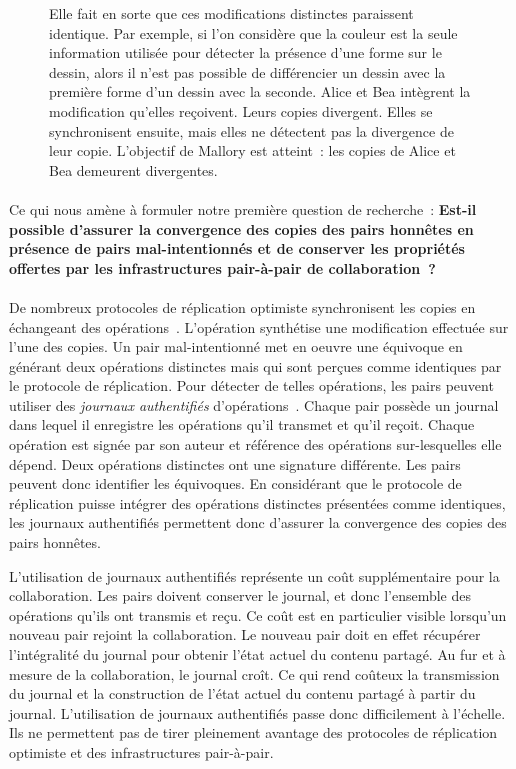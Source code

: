 \begin{figure}[hbt]
{Elle fait en sorte que ces modifications distinctes paraissent identique.
Par exemple, si l'on considère que la couleur est la seule information utilisée pour détecter la présence d'une forme sur le dessin, alors il n'est pas possible de différencier un dessin avec la première forme d'un dessin avec la seconde.
 Alice et Bea intègrent la modification qu'elles reçoivent.
Leurs copies divergent.
Elles se synchronisent ensuite, mais elles ne détectent pas la divergence de leur copie.
L'objectif de Mallory est atteint~: les copies de Alice et Bea demeurent divergentes.}\label{fig:equivocation-scenario}
\end{figure}

\paragraph{}Ce qui nous amène à formuler notre première question de recherche~: \textbf{Est-il possible d'assurer la convergence des copies des pairs honnêtes en présence de pairs mal-intentionnés et de conserver les propriétés offertes par les infrastructures pair-à-pair de collaboration~?}

\paragraph{}De nombreux protocoles de réplication optimiste synchronisent les copies en échangeant des opérations~\autocite{baquero_2018_pure-op-crdt}.
L'opération synthétise une modification effectuée sur l'une des copies.
Un pair mal-intentionné met en oeuvre une équivoque en générant deux opérations distinctes mais qui sont perçues comme identiques par le protocole de réplication.
Pour détecter de telles opérations, les pairs peuvent utiliser des \emph{journaux authentifiés} d'opérations~\autocite{li_2004_sundr,mahajan_depot_2011,truong_authenticating_2012}.
Chaque pair possède un journal dans lequel il enregistre les opérations qu'il transmet et qu'il reçoit.
Chaque opération est signée par son auteur et référence des opérations sur-lesquelles elle dépend.
Deux opérations distinctes ont une signature différente.
Les pairs peuvent donc identifier les équivoques.
En considérant que le protocole de réplication puisse intégrer des opérations distinctes présentées comme identiques, les journaux authentifiés permettent donc d'assurer la convergence des copies des pairs honnêtes.

L'utilisation de journaux authentifiés représente un coût supplémentaire pour la collaboration.
Les pairs doivent conserver le journal, et donc l'ensemble des opérations qu'ils ont transmis et reçu.
Ce coût est en particulier visible lorsqu'un nouveau pair rejoint la collaboration.
Le nouveau pair doit en effet récupérer l'intégralité du journal pour obtenir l'état actuel du contenu partagé.
Au fur et à mesure de la collaboration, le journal croît.
Ce qui rend coûteux la transmission du journal et la construction de l'état actuel du contenu partagé à partir du journal.
L'utilisation de journaux authentifiés passe donc difficilement à l'échelle.
Ils ne permettent pas de tirer pleinement avantage des protocoles de réplication optimiste et des infrastructures pair-à-pair.

